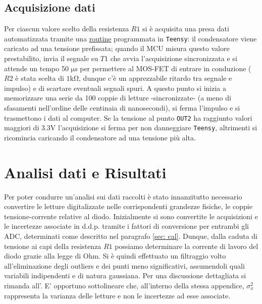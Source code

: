 \documentclass{article}[a4paper, oneside, 11pt]
\begin{document}
\subsection{Acquisizione dati}
Per ciascun valore scelto della resistenza $R1$ si è acquisita una presa 
dati automatizzata tramite una 
\href{https://github.com/LucaCiucci/relaz_seme/blob/master/sketches/teensy_differenziale_definitivo/teensy_differenziale_definitivo.ino}
{routine} programmata in \verb+Teensy+: il condensatore viene caricato ad una
tensione prefissata; quando il MCU misura questo valore prestabilito,
invia il segnale su $T1$ che avvia l'acquisizione sincronizzata
e si attende un tempo 50 $\si{\us}$ per permettere al MOS-FET di entrare in
conduzione ($R2$ è stata scelta di $1 \si{\kohm}$, dunque c'è un apprezzabile
ritardo tra segnale e impulso) e di scartare eventuali segnali spuri.
A questo punto si inizia a memorizzare una serie da 100 coppie di letture
-sincronizzate- (a meno di sfasamenti nell'ordine delle centinaia di
nanosecondi), si ferma l'impulso e si trasmettono i dati al computer.
Se la tensione al punto \verb+OUT2+ ha raggiunto valori maggiori di $3.3\si{\V}$
l'acquisizione si ferma per non danneggiare \verb+Teensy+, altrimenti si
ricomincia caricando il condensatore ad una tensione più alta.

\section{Analisi dati e Risultati}
Per poter condurre un'analisi sui dati raccolti è stato innanzitutto
necessario convertire le letture digitalizzate nelle corrispondenti
grandezze fisiche, le coppie tensione-corrente relative al diodo.
Inizialmente si sono convertite le acquisizioni e le incertezze associate in
d.d.p. tramite i fattori di conversione per entrambi gli ADC,
determinati come descritto nel paragrafo \ref{sec: cal}.
Dunque, dalla caduta di tensione ai capi della resistenza $R1$ possiamo
determinare la corrente di lavoro del diodo grazie alla legge di Ohm. 
Si è quindi effettuato un filtraggio volto all'eliminazione degli outliers e 
dei punti meno significativi, assumendoli quali variabili indipendenti e di 
natura gaussiana. Per una discussione dettagliata si rimanda all'. E’ opportuno sottolineare che, all’interno della stessa appendice, 
$\sigma_x^2$ rappresenta la varianza delle letture e non le incertezze ad esse
associate.
\end{document}
